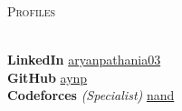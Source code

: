 \documentclass[a4paper]{article}
\newcommand{\lineunder} {
    \vspace*{-8pt} \\
    \hspace*{-18pt} \hrulefill \\
}
\newcommand{\header} [1] {
    {\hspace*{-18pt}\vspace*{6pt} \textsc{#1}}
    \vspace*{-6pt} \lineunder
}
\begin{document}

\header{Profiles}
\vspace{1mm}

{\textbf{LinkedIn}} \hfill \href{https://www.linkedin.com/in/aryanpathania03/}{aryanpathania03}\\
{\textbf{GitHub}} \hfill \href{https://www.github.com/aynp}{aynp}\\
{\textbf{Codeforces}} {\sl (Specialist)}  \hfill \href{https://codeforces.com/profile/nand}{nand}\\
\
\end{document}
